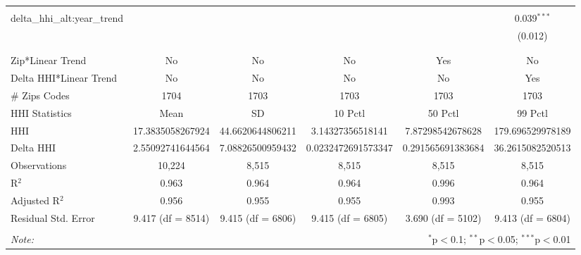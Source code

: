 \begin{table}[H]
{\begin{tabular}{@{\extracolsep{5pt}}lccccc}
   & & & & & \\  

  delta\_hhi\_alt:year\_trend &  &  &  &  & 0.039$^{***}$ \\  

   &  &  &  &  & (0.012) \\  

   & & & & & \\  

 \hline \\[-1.8ex]  

 Zip*Linear Trend & No & No & No & Yes & No \\  

 Delta HHI*Linear Trend & No & No & No & No & Yes \\  

 # Zips Codes & 1704 & 1703 & 1703 & 1703 & 1703 \\  

 HHI Statistics & Mean & SD & 10 Pctl & 50 Pctl & 99 Pctl \\  

 HHI & 17.3835058267924 & 44.6620644806211 & 3.14327356518141 & 7.87298542678628 & 179.696529978189 \\  

 Delta HHI & 2.55092741644564 & 7.08826500959432 & 0.0232472691573347 & 0.291565691383684 & 36.2615082520513 \\  

 Observations & 10,224 & 8,515 & 8,515 & 8,515 & 8,515 \\  

 R$^{2}$ & 0.963 & 0.964 & 0.964 & 0.996 & 0.964 \\  

 Adjusted R$^{2}$ & 0.956 & 0.955 & 0.955 & 0.993 & 0.955 \\  

 Residual Std. Error & 9.417 (df = 8514) & 9.415 (df = 6806) & 9.415 (df = 6805) & 3.690 (df = 5102) & 9.413 (df = 6804) \\  

 \hline  

 \hline \\[-1.8ex]  

 \textit{Note:}  & \multicolumn{5}{r}{$^{*}$p$<$0.1; $^{**}$p$<$0.05; $^{***}$p$<$0.01} \\  

 \end{tabular}}  

 \end{table}  

